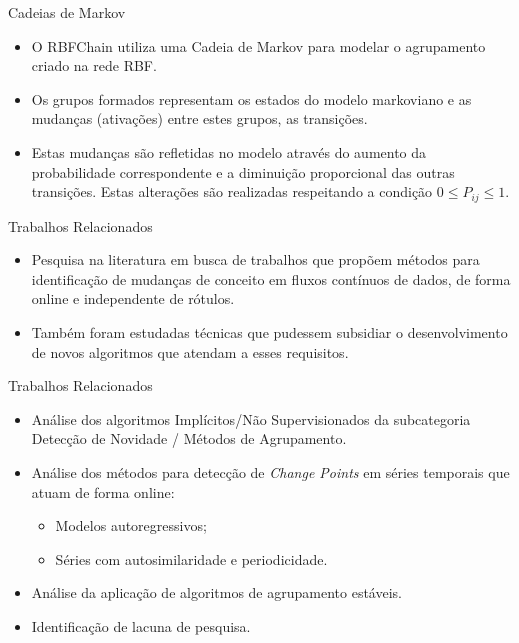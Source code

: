 \documentclass[10pt]{beamer}
\begin{document}
\begin{frame}{Cadeias de Markov}
    \begin{itemize}
        \item<1 -> O RBFChain utiliza uma Cadeia de Markov para modelar o agrupamento criado na rede RBF.
        \item<1 -> Os grupos formados representam os estados do modelo markoviano e as mudanças (ativações) entre estes grupos, as transições.
        \item<1 -> Estas mudanças são refletidas no modelo através do aumento da probabilidade  correspondente e a diminuição proporcional das outras transições. Estas alterações são realizadas respeitando a condição $0 \leq P_{ij} \leq 1$.
      \end{itemize}
\end{frame}

\begin{frame}{Trabalhos Relacionados}
    \begin{itemize}
        \item<1 -> Pesquisa na literatura em busca de trabalhos que propõem métodos para identificação de mudanças de conceito em fluxos contínuos de dados, de forma online e independente de rótulos.
        \item<1 -> Também foram estudadas técnicas que pudessem subsidiar o desenvolvimento de novos algoritmos que atendam a esses requisitos.
    \end{itemize}
\end{frame}

\begin{frame}{Trabalhos Relacionados}
    \begin{itemize}
        \item<1 -> Análise dos algoritmos \alert{Implícitos/Não Supervisionados} da subcategoria \alert{Detecção de Novidade / Métodos de Agrupamento}.
        \item<1 -> Análise dos métodos para detecção de \textit{Change Points} em séries temporais que atuam de forma online:
        \begin{itemize}
            \item<1 -> Modelos autoregressivos;
            \item<1 -> Séries com autosimilaridade e periodicidade.
        \end{itemize}
        \item<1 -> Análise da aplicação de algoritmos de agrupamento estáveis.
        \item<1 -> Identificação de lacuna de pesquisa.
      \end{itemize}
\end{frame}
\end{document}

